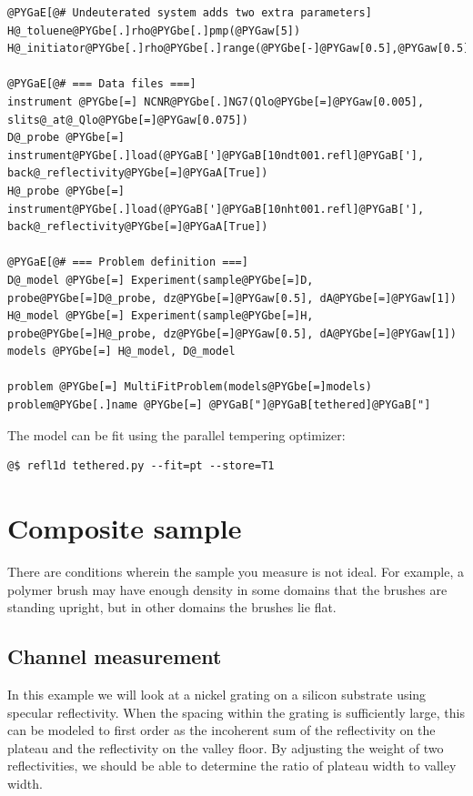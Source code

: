 \documentclass[letterpaper,10pt,english]{sphinxmanual}
\begin{document}
\begin{Verbatim}[commandchars=@\[\]]
@PYGaE[@# Undeuterated system adds two extra parameters]
H@_toluene@PYGbe[.]rho@PYGbe[.]pmp(@PYGaw[5])
H@_initiator@PYGbe[.]rho@PYGbe[.]range(@PYGbe[-]@PYGaw[0.5],@PYGaw[0.5])

@PYGaE[@# === Data files ===]
instrument @PYGbe[=] NCNR@PYGbe[.]NG7(Qlo@PYGbe[=]@PYGaw[0.005], slits@_at@_Qlo@PYGbe[=]@PYGaw[0.075])
D@_probe @PYGbe[=] instrument@PYGbe[.]load(@PYGaB[']@PYGaB[10ndt001.refl]@PYGaB['], back@_reflectivity@PYGbe[=]@PYGaA[True])
H@_probe @PYGbe[=] instrument@PYGbe[.]load(@PYGaB[']@PYGaB[10nht001.refl]@PYGaB['], back@_reflectivity@PYGbe[=]@PYGaA[True])

@PYGaE[@# === Problem definition ===]
D@_model @PYGbe[=] Experiment(sample@PYGbe[=]D, probe@PYGbe[=]D@_probe, dz@PYGbe[=]@PYGaw[0.5], dA@PYGbe[=]@PYGaw[1])
H@_model @PYGbe[=] Experiment(sample@PYGbe[=]H, probe@PYGbe[=]H@_probe, dz@PYGbe[=]@PYGaw[0.5], dA@PYGbe[=]@PYGaw[1])
models @PYGbe[=] H@_model, D@_model

problem @PYGbe[=] MultiFitProblem(models@PYGbe[=]models)
problem@PYGbe[.]name @PYGbe[=] @PYGaB["]@PYGaB[tethered]@PYGaB["]
\end{Verbatim}

The model can be fit using the parallel tempering optimizer:

\begin{Verbatim}[commandchars=@\[\]]
@$ refl1d tethered.py --fit=pt --store=T1
\end{Verbatim}


\section{Composite sample}
\label{examples/mixed/readme:composite-sample}\label{examples/mixed/readme::doc}
There are conditions wherein the sample you measure is not ideal.  For
example, a polymer brush may have enough density in some domains that
the brushes are standing upright, but in other domains the brushes
lie flat.


\subsection{Channel measurement}
\label{examples/mixed/mixed:channel-measurement}\label{examples/mixed/mixed::doc}
In this example we will look at a nickel grating on a silicon substrate
using specular reflectivity. When the spacing within the grating is
sufficiently large, this can be modeled to first order as the incoherent sum
of the reflectivity on the plateau and the reflectivity on the valley floor.
By adjusting the weight of two reflectivities, we should be able to
determine the ratio of plateau width to valley width.
\end{document}
